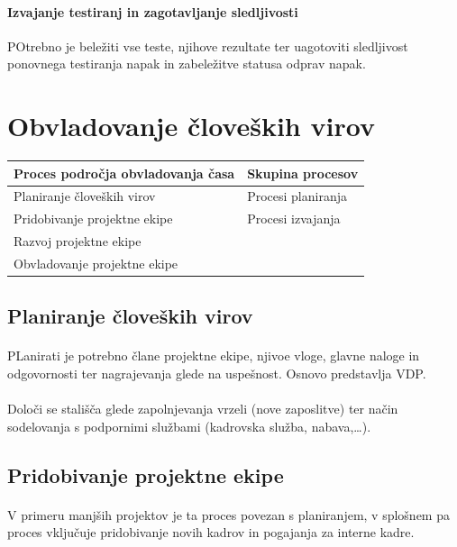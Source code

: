\documentclass[a4paper,12pt]{report}
\begin{document}
         \paragraph{Izvajanje testiranj in zagotavljanje sledljivosti} POtrebno je beležiti vse teste, njihove rezultate ter uagotoviti sledljivost ponovnega testiranja napak in zabeležitve statusa odprav napak.

   \section{Obvladovanje človeških virov}
      \begin{center}
         \begin{tabular}{|l|l|}
            \hline
            \textbf{Proces področja obvladovanja časa} & \textbf{Skupina procesov} \\
            \hline
            \hline
            Planiranje človeških virov & Procesi planiranja \\
            \hline
            Pridobivanje projektne ekipe & Procesi izvajanja \\
            Razvoj projektne ekipe & \\
            Obvladovanje projektne ekipe & \\
            \hline
         \end{tabular}
      \end{center}

      \subsection{Planiranje človeških virov}
         \paragraph{} PLanirati je potrebno člane projektne ekipe, njivoe vloge, glavne naloge in odgovornosti ter nagrajevanja glede na uspešnost. Osnovo predstavlja VDP.
         \paragraph{} Določi se stališča glede zapolnjevanja vrzeli (nove zaposlitve) ter način sodelovanja s podpornimi službami (kadrovska služba, nabava,\dots).
      \subsection{Pridobivanje projektne ekipe}
         \paragraph{} V primeru manjših projektov je ta proces povezan s planiranjem, v splošnem pa proces vključuje pridobivanje novih kadrov in pogajanja za interne kadre.
\end{document}
